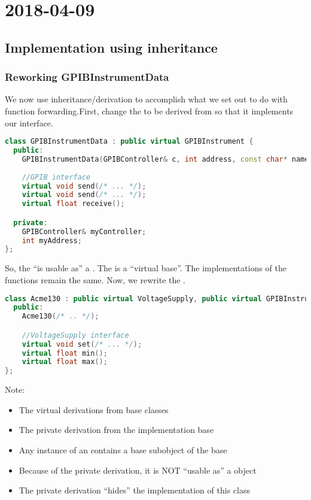 \section{2018-04-09}

\subsection{Implementation using inheritance}

\subsubsection{Reworking GPIBInstrumentData}

We now use inheritance/derivation to accomplish what we set out to do with function forwarding.First, change the  to be derived from  so that it implements our interface.

\begin{lstlisting}[language=C++]
class GPIBInstrumentData : public virtual GPIBInstrument {
  public:
    GPIBInstrumentData(GPIBController& c, int address, const char* name);
    
    //GPIB interface
    virtual void send(/* ... */);
    virtual void send(/* ... */);
    virtual float receive();

  private:
    GPIBController& myController;
    int myAddress;
};
\end{lstlisting}

So, the  ``is usable as'' a . The  is a ``virtual base''. The implementations of the functions remain the same. Now, we rewrite the .

\begin{lstlisting}[language=C++]
class Acme130 : public virtual VoltageSupply, public virtual GPIBInstrument, private GPIBInstrumentData {
  public:
    Acme130(/* .. */);

    //VoltageSupply interface
    virtual void set(/* ... */);
    virtual float min();
    virtual float max();
};
\end{lstlisting}

Note:

\begin{itemize}
  \item The virtual derivations from base classes
  \item The private derivation from the implementation base
  \item Any instance of an  contains a base subobject of the base
  \item Because of the private derivation, it is NOT ``usable as'' a  object
  \item The private derivation ``hides'' the implementation of this class
\end{itemize}

